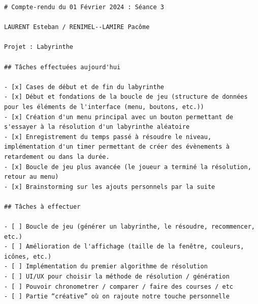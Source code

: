 \documentclass[12pt]{scrreprt} %
\begin{document}
\begin{verbatim}
# Compte-rendu du 01 Février 2024 : Séance 3

LAURENT Esteban / RENIMEL--LAMIRE Pacôme

Projet : Labyrinthe

## Tâches effectuées aujourd'hui

- [x] Cases de début et de fin du labyrinthe
- [x] Début et fondations de la boucle de jeu (structure de données pour les éléments de l'interface (menu, boutons, etc.))
- [x] Création d'un menu principal avec un bouton permettant de s'essayer à la résolution d'un labyrinthe aléatoire
- [x] Enregistrement du temps passé à résoudre le niveau, implémentation d'un timer permettant de créer des évènements à retardement ou dans la durée.
- [x] Boucle de jeu plus avancée (le joueur a terminé la résolution, retour au menu)
- [x] Brainstorming sur les ajouts personnels par la suite

## Tâches à effectuer

- [ ] Boucle de jeu (générer un labyrinthe, le résoudre, recommencer, etc.)
- [ ] Amélioration de l'affichage (taille de la fenêtre, couleurs, icônes, etc.)
- [ ] Implémentation du premier algorithme de résolution
- [ ] UI/UX pour choisir la méthode de résolution / génération
- [ ] Pouvoir chronometrer / comparer / faire des courses / etc
- [ ] Partie “créative” où on rajoute notre touche personnelle

\end{verbatim}
\end{document}
